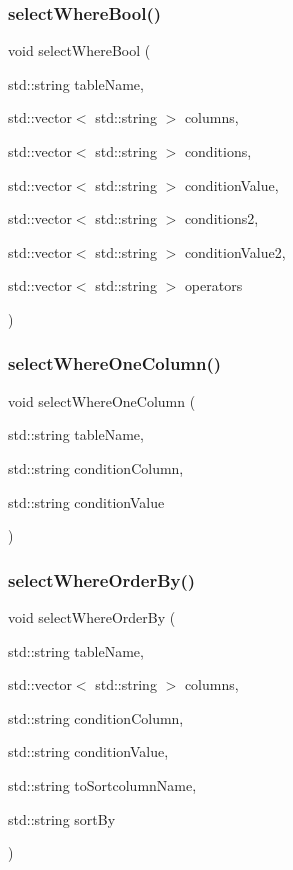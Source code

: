 \mbox{\label{sqllib_8hpp_a0c986e9aa0e2d7e080ba5eb294a1182e}} 
\subsubsection{select\+Where\+Bool()}
{\footnotesize\ttfamily void select\+Where\+Bool (\begin{DoxyParamCaption}\item[{std\+::string}]{table\+Name,  }\item[{std\+::vector$<$ std\+::string $>$}]{columns,  }\item[{std\+::vector$<$ std\+::string $>$}]{conditions,  }\item[{std\+::vector$<$ std\+::string $>$}]{condition\+Value,  }\item[{std\+::vector$<$ std\+::string $>$}]{conditions2,  }\item[{std\+::vector$<$ std\+::string $>$}]{condition\+Value2,  }\item[{std\+::vector$<$ std\+::string $>$}]{operators }\end{DoxyParamCaption})}

\mbox{\label{sqllib_8hpp_a519933061d4010c3a8d743b7e9fa9939}} 
\subsubsection{select\+Where\+One\+Column()}
{\footnotesize\ttfamily void select\+Where\+One\+Column (\begin{DoxyParamCaption}\item[{std\+::string}]{table\+Name,  }\item[{std\+::string}]{condition\+Column,  }\item[{std\+::string}]{condition\+Value }\end{DoxyParamCaption})}

\mbox{\label{sqllib_8hpp_a94269766ff6e39ba8a38f5623314c3cd}} 
\subsubsection{select\+Where\+Order\+By()}
{\footnotesize\ttfamily void select\+Where\+Order\+By (\begin{DoxyParamCaption}\item[{std\+::string}]{table\+Name,  }\item[{std\+::vector$<$ std\+::string $>$}]{columns,  }\item[{std\+::string}]{condition\+Column,  }\item[{std\+::string}]{condition\+Value,  }\item[{std\+::string}]{to\+Sortcolumn\+Name,  }\item[{std\+::string}]{sort\+By }\end{DoxyParamCaption})}

